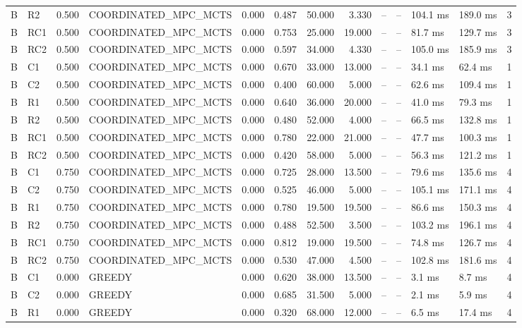 \begin{table}
{\begin{tabular}{llrlrrrrrrllr}
B & R2 & 0.500 & COORDINATED\_MPC\_MCTS & 0.000 & 0.487 & 50.000 & 3.330 & -- & -- & 104.1 ms & 189.0 ms & 3 \\
B & RC1 & 0.500 & COORDINATED\_MPC\_MCTS & 0.000 & 0.753 & 25.000 & 19.000 & -- & -- & 81.7 ms & 129.7 ms & 3 \\
B & RC2 & 0.500 & COORDINATED\_MPC\_MCTS & 0.000 & 0.597 & 34.000 & 4.330 & -- & -- & 105.0 ms & 185.9 ms & 3 \\
B & C1 & 0.500 & COORDINATED\_MPC\_MCTS & 0.000 & 0.670 & 33.000 & 13.000 & -- & -- & 34.1 ms & 62.4 ms & 1 \\
B & C2 & 0.500 & COORDINATED\_MPC\_MCTS & 0.000 & 0.400 & 60.000 & 5.000 & -- & -- & 62.6 ms & 109.4 ms & 1 \\
B & R1 & 0.500 & COORDINATED\_MPC\_MCTS & 0.000 & 0.640 & 36.000 & 20.000 & -- & -- & 41.0 ms & 79.3 ms & 1 \\
B & R2 & 0.500 & COORDINATED\_MPC\_MCTS & 0.000 & 0.480 & 52.000 & 4.000 & -- & -- & 66.5 ms & 132.8 ms & 1 \\
B & RC1 & 0.500 & COORDINATED\_MPC\_MCTS & 0.000 & 0.780 & 22.000 & 21.000 & -- & -- & 47.7 ms & 100.3 ms & 1 \\
B & RC2 & 0.500 & COORDINATED\_MPC\_MCTS & 0.000 & 0.420 & 58.000 & 5.000 & -- & -- & 56.3 ms & 121.2 ms & 1 \\
B & C1 & 0.750 & COORDINATED\_MPC\_MCTS & 0.000 & 0.725 & 28.000 & 13.500 & -- & -- & 79.6 ms & 135.6 ms & 4 \\
B & C2 & 0.750 & COORDINATED\_MPC\_MCTS & 0.000 & 0.525 & 46.000 & 5.000 & -- & -- & 105.1 ms & 171.1 ms & 4 \\
B & R1 & 0.750 & COORDINATED\_MPC\_MCTS & 0.000 & 0.780 & 19.500 & 19.500 & -- & -- & 86.6 ms & 150.3 ms & 4 \\
B & R2 & 0.750 & COORDINATED\_MPC\_MCTS & 0.000 & 0.488 & 52.500 & 3.500 & -- & -- & 103.2 ms & 196.1 ms & 4 \\
B & RC1 & 0.750 & COORDINATED\_MPC\_MCTS & 0.000 & 0.812 & 19.000 & 19.500 & -- & -- & 74.8 ms & 126.7 ms & 4 \\
B & RC2 & 0.750 & COORDINATED\_MPC\_MCTS & 0.000 & 0.530 & 47.000 & 4.500 & -- & -- & 102.8 ms & 181.6 ms & 4 \\
B & C1 & 0.000 & GREEDY & 0.000 & 0.620 & 38.000 & 13.500 & -- & -- & 3.1 ms & 8.7 ms & 4 \\
B & C2 & 0.000 & GREEDY & 0.000 & 0.685 & 31.500 & 5.000 & -- & -- & 2.1 ms & 5.9 ms & 4 \\
B & R1 & 0.000 & GREEDY & 0.000 & 0.320 & 68.000 & 12.000 & -- & -- & 6.5 ms & 17.4 ms & 4 \\

\end{tabular}}
\end{table}
